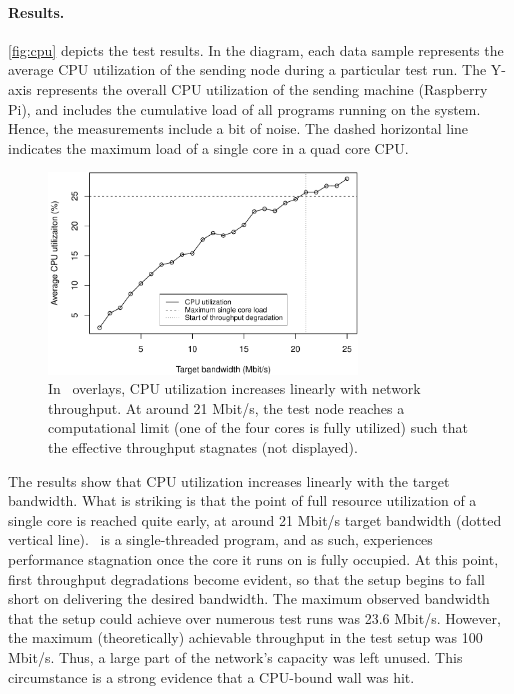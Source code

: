 \paragraph{Results.} 
\autoref{fig:cpu} depicts the test results. In the diagram, each data sample represents the average CPU utilization of the sending node during a particular test run. The Y-axis represents the overall CPU utilization of the sending machine (Raspberry Pi), and includes the cumulative load of all programs running on the system. Hence, the measurements include a bit of noise. The dashed horizontal line indicates the maximum load of a single core in a quad core CPU.
\begin{figure}[htpb]
  \centering
  \includegraphics[width=0.73\textwidth]{figures/cpu}
  \caption[\weave\ CPU utilization test results]{In \weave\ overlays, CPU utilization increases linearly with network throughput. At around 21 Mbit/s, the test node reaches a computational limit (one of the four cores is fully utilized) such that the effective throughput stagnates (not displayed).}\label{fig:cpu}
\end{figure}

The results show that CPU utilization increases linearly with the target bandwidth. What is striking is that the point of full resource utilization of a single core is reached quite early, at around 21 Mbit/s target bandwidth (dotted vertical line). \wnet\ is a single-threaded program, and as such, experiences performance stagnation once the core it runs on is fully occupied. At this point, first throughput degradations become evident, so that the setup begins to fall short on delivering the desired bandwidth. The maximum observed bandwidth that the setup could achieve over numerous test runs was 23.6 Mbit/s.
However, the maximum (theoretically) achievable throughput in the test setup was 100 Mbit/s. Thus, a large part of the network's capacity was left unused. This circumstance is a strong evidence that a CPU-bound wall was hit.
%
%
%
%
%
%
%
%
%
%

